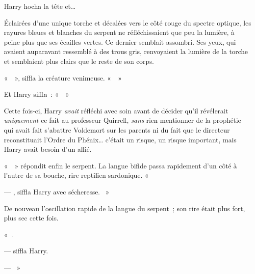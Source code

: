 Harry hocha la tête et…

Éclairées d'une unique torche et décalées vers le côté rouge du spectre optique, les rayures bleues et blanches du serpent ne réfléchissaient que peu la lumière, à peine plus que ses écailles vertes. Ce dernier semblait assombri. Ses yeux, qui avaient auparavant ressemblé à des trous gris, renvoyaient la lumière de la torche et semblaient plus clairs que le reste de son corps.

«~~», siffla la créature venimeuse. «~~»

Et Harry siffla~: «~~»

Cette fois-ci, Harry \emph{avait} réfléchi avec soin avant de décider qu'il révélerait \emph{uniquement} ce fait au professeur Quirrell, \emph{sans} rien mentionner de la prophétie qui avait fait s'abattre Voldemort sur les parents ni du fait que le directeur reconstituait l'Ordre du Phénix… c'était un risque, un risque important, mais Harry avait besoin d'un allié.

«~~» répondit enfin le serpent. La langue bifide passa rapidement d'un côté à l'autre de sa bouche, rire reptilien sardonique. «~

--- , siffla Harry avec sécheresse. ~»

De nouveau l'oscillation rapide de la langue du serpent~; son rire était plus fort, plus sec cette fois.

«~.

---  siffla Harry.

--- ~»

